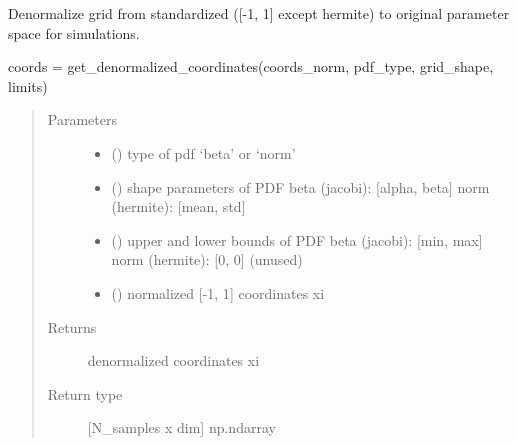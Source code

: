 \documentclass[letterpaper,10pt,english,openany,oneside]{sphinxmanual}
\begin{document}
\begin{fulllineitems}
\label{\detokenize{pygpc:pygpc.grid.get_denormalized_coordinates}}
Denormalize grid from standardized ({[}-1, 1{]} except hermite) to original parameter space for simulations.

coords = get\_denormalized\_coordinates(coords\_norm, pdf\_type, grid\_shape, limits)
\begin{quote}\begin{description}
\item[{Parameters}] \leavevmode\begin{itemize}
\item {} 
 (\sphinxstyleliteralemphasis{\sphinxupquote{{[}}}\sphinxstyleliteralemphasis{\sphinxupquote{{]} }}) \textendash{} type of pdf ‘beta’ or ‘norm’

\item {} 
 (\sphinxstyleliteralemphasis{\sphinxupquote{{[}}}\sphinxstyleliteralemphasis{\sphinxupquote{{]} }}) \textendash{} shape parameters of PDF
beta (jacobi):  {[}alpha, beta{]}
norm (hermite): {[}mean, std{]}

\item {} 
 (\sphinxstyleliteralemphasis{\sphinxupquote{{[}}}\sphinxstyleliteralemphasis{\sphinxupquote{{]} }}) \textendash{} upper and lower bounds of PDF
beta (jacobi):  {[}min, max{]}
norm (hermite): {[}0, 0{]} (unused)

\item {} 
 (\sphinxstyleliteralemphasis{\sphinxupquote{{[}}}\sphinxstyleliteralemphasis{\sphinxupquote{{]} }}) \textendash{} normalized {[}-1, 1{]} coordinates xi

\end{itemize}

\item[{Returns}] \leavevmode
{} \textendash{} denormalized coordinates xi

\item[{Return type}] \leavevmode
{[}N\_samples x dim{]} np.ndarray

\end{description}\end{quote}

\end{fulllineitems}
\end{document}
